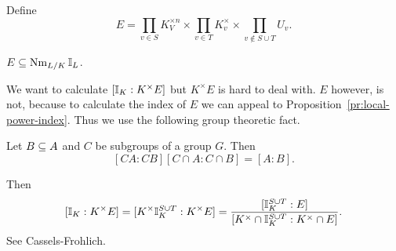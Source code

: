Define 
\[
E=\prod_{v\in S}K_V^{\times n}\times \prod_{v\in T} K_v^{\times}\times \prod_{v\nin S\cup T} U_v.
\]
\begin{lem}
$E\subseteq \operatorname{Nm}_{L/K}\mathbb{I}_L$.
\end{lem}
We want to calculate $[\mathbb{I}_K:K^{\times}E]$ but $K^{\times } E$ is hard to deal with. $E$ however, is not, because to calculate the index of $E$ we can appeal to Proposition~\ref{pr:local-power-index}. Thus we use the following group theoretic fact.
\begin{pr}
Let $B\subseteq A$ and $C$ be subgroups of a group $G$. Then
\[
[CA:CB][C\cap A:C\cap B]=[A:B].
\]
\end{pr}
Then
\[
[\mathbb{I}_K:K^{\times}E]=
[K^{\times}\mathbb{I}_{K}^{S\cup T}:K^{\times}E]=
\frac{[\mathbb{I}_{K}^{S\cup T}:E]}{[K^{\times}\cap \mathbb{I}_K^{S\cup T}:K^{\times}\cap E]}.
\]
See Cassels-Frohlich.
%
%
%
